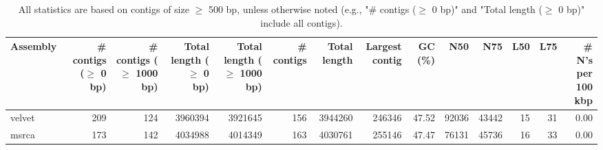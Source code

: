 \documentclass[12pt,a4paper]{article}
\begin{document}
\begin{table}[ht]
\begin{center}
\caption{All statistics are based on contigs of size $\geq$ 500 bp, unless otherwise noted (e.g., "\# contigs ($\geq$ 0 bp)" and "Total length ($\geq$ 0 bp)" include all contigs).}
\begin{tabular}{|l*{13}{|r}|}
\hline
Assembly & \# contigs ($\geq$ 0 bp) & \# contigs ($\geq$ 1000 bp) & Total length ($\geq$ 0 bp) & Total length ($\geq$ 1000 bp) & \# contigs & Total length & Largest contig & GC (\%) & N50 & N75 & L50 & L75 & \# N's per 100 kbp \\ \hline
velvet & 209 & 124 & 3960394 & 3921645 & 156 & 3944260 & 246346 & 47.52 & 92036 & 43442 & 15 & 31 & 0.00 \\ \hline
msrca & 173 & 142 & 4034988 & 4014349 & 163 & 4030761 & 255146 & 47.47 & 76131 & 45736 & 16 & 33 & 0.00 \\ \hline
\end{tabular}
\end{center}
\end{table}
\end{document}
